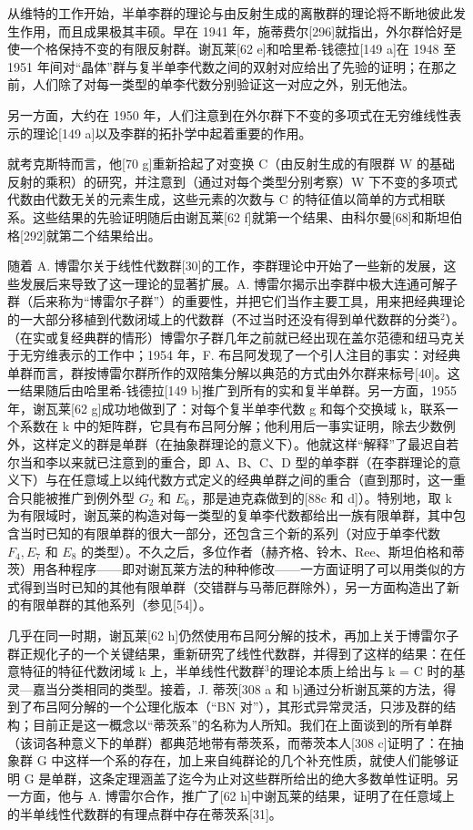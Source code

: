 从维特的工作开始，半单李群的理论与由反射生成的离散群的理论将不断地彼此发生作用，而且成果极其丰硕。早在 1941 年，施蒂费尔{[}296{]}就指出，外尔群恰好是使一个格保持不变的有限反射群。谢瓦莱{[}62 e{]}和哈里希-钱德拉{[}149 a{]}在 1948 至 1951 年间对“晶体”群与复半单李代数之间的双射对应给出了先验的证明；在那之前，人们除了对每一类型的单李代数分别验证这一对应之外，别无他法。

另一方面，大约在 1950 年，人们注意到在外尔群下不变的多项式在无穷维线性表示的理论{[}149 a{]}以及李群的拓扑学中起着重要的作用。

就考克斯特而言，他{[}70 g{]}重新拾起了对变换 C（由反射生成的有限群 W 的基础反射的乘积）的研究，并注意到（通过对每个类型分别考察）W 下不变的多项式代数由代数无关的元素生成，这些元素的次数与 C 的特征值以简单的方式相联系。这些结果的先验证明随后由谢瓦莱{[}62 f{]}就第一个结果、由科尔曼{[}68{]}和斯坦伯格{[}292{]}就第二个结果给出。

随着 A. 博雷尔关于线性代数群{[}30{]}的工作，李群理论中开始了一些新的发展，这些发展后来导致了这一理论的显著扩展。A. 博雷尔揭示出李群中极大连通可解子群（后来称为“博雷尔子群”）的重要性，并把它们当作主要工具，用来把经典理论的一大部分移植到代数闭域上的代数群（不过当时还没有得到单代数群的分类\(^{2}\)）。（在实或复经典群的情形）博雷尔子群几年之前就已经出现在盖尔范德和纽马克关于无穷维表示的工作中；1954 年，F. 布吕阿发现了一个引人注目的事实：对经典单群而言，群按博雷尔群所作的双陪集分解以典范的方式由外尔群来标号{[}40{]}。这一结果随后由哈里希-钱德拉{[}149 b{]}推广到所有的实和复半单群。另一方面，1955 年，谢瓦莱{[}62 g{]}成功地做到了：对每个复半单李代数 g 和每个交换域 k，联系一个系数在 k 中的矩阵群，它具有布吕阿分解；他利用后一事实证明，除去少数例外，这样定义的群是单群（在抽象群理论的意义下）。他就这样“解释”了最迟自若尔当和李以来就已注意到的重合，即 A、B、C、D 型的单李群（在李群理论的意义下）与在任意域上以纯代数方式定义的经典单群之间的重合（直到那时，这一重合只能被推广到例外型 \(G_{2}\) 和 \(E_{6}\)，那是迪克森做到的{[}88c 和 d{]}）。特别地，取 k 为有限域时，谢瓦莱的构造对每一类型的复单李代数都给出一族有限单群，其中包含当时已知的有限单群的很大一部分，还包含三个新的系列（对应于单李代数 \(F_{4}, E_{7}\) 和 \(E_{8}\) 的类型）。不久之后，多位作者（赫齐格、铃木、Ree、斯坦伯格和蒂茨）用各种程序——即对谢瓦莱方法的种种修改——一方面证明了可以用类似的方式得到当时已知的其他有限单群（交错群与马蒂厄群除外），另一方面构造出了新的有限单群的其他系列（参见{[}54{]}）。

几乎在同一时期，谢瓦莱{[}62 h{]}仍然使用布吕阿分解的技术，再加上关于博雷尔子群正规化子的一个关键结果，重新研究了线性代数群，并得到了这样的结果：在任意特征的特征代数闭域 k 上，半单线性代数群\(^{3}\)的理论本质上给出与 k = C 时的基灵—嘉当分类相同的类型。接着，J. 蒂茨{[}308 a 和 b{]}通过分析谢瓦莱的方法，得到了布吕阿分解的一个公理化版本（“BN 对”），其形式异常灵活，只涉及群的结构；目前正是这一概念以“蒂茨系”的名称为人所知。我们在上面谈到的所有单群（该词各种意义下的单群）都典范地带有蒂茨系，而蒂茨本人{[}308 c{]}证明了：在抽象群 G 中这样一个系的存在，加上来自纯群论的几个补充性质，就使人们能够证明 G 是单群，这条定理涵盖了迄今为止对这些群所给出的绝大多数单性证明。另一方面，他与 A. 博雷尔合作，推广了{[}62 h{]}中谢瓦莱的结果，证明了在任意域上的半单线性代数群的有理点群中存在蒂茨系{[}31{]}。


